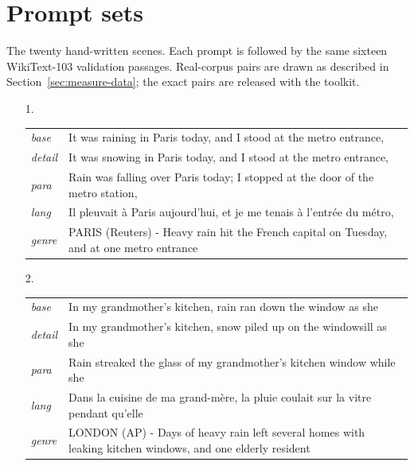 \documentclass[11pt]{article}
\theoremstyle{definition}
\theoremstyle{remark}
\begin{document}
\section{Prompt sets}
\label{app:prompts}
The twenty hand-written scenes. Each prompt is followed by the same sixteen WikiText-103 validation passages. Real-corpus pairs are drawn as described in Section~\ref{sec:measure-data}; the exact pairs are released with the toolkit.

{\small\begin{itemize}\setlength\itemsep{0.4em}
\item[1.] \begin{tabular}[t]{@{}ll@{}}\emph{base} & \parbox[t]{0.78\linewidth}{It was raining in Paris today, and I stood at the metro entrance,}\\\emph{detail} & \parbox[t]{0.78\linewidth}{It was snowing in Paris today, and I stood at the metro entrance,}\\\emph{para} & \parbox[t]{0.78\linewidth}{Rain was falling over Paris today; I stopped at the door of the metro station,}\\\emph{lang} & \parbox[t]{0.78\linewidth}{Il pleuvait à Paris aujourd'hui, et je me tenais à l'entrée du métro,}\\\emph{genre} & \parbox[t]{0.78\linewidth}{PARIS (Reuters) - Heavy rain hit the French capital on Tuesday, and at one metro entrance}\\\end{tabular}
\item[2.] \begin{tabular}[t]{@{}ll@{}}\emph{base} & \parbox[t]{0.78\linewidth}{In my grandmother's kitchen, rain ran down the window as she}\\\emph{detail} & \parbox[t]{0.78\linewidth}{In my grandmother's kitchen, snow piled up on the windowsill as she}\\\emph{para} & \parbox[t]{0.78\linewidth}{Rain streaked the glass of my grandmother's kitchen window while she}\\\emph{lang} & \parbox[t]{0.78\linewidth}{Dans la cuisine de ma grand-mère, la pluie coulait sur la vitre pendant qu'elle}\\\emph{genre} & \parbox[t]{0.78\linewidth}{LONDON (AP) - Days of heavy rain left several homes with leaking kitchen windows, and one elderly resident}\\\end{tabular}

\end{itemize}}
\end{document}
